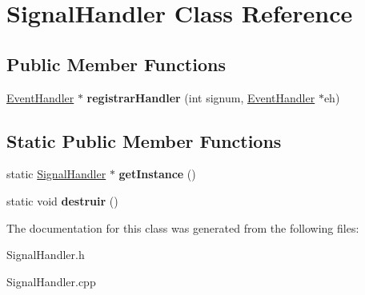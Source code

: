 \hypertarget{classSignalHandler}{\section{Signal\-Handler Class Reference}
\label{classSignalHandler}
}
\subsection*{Public Member Functions}
\begin{DoxyCompactItemize}
\item 
\hypertarget{classSignalHandler_a41a15d866eed0c4df9ef8f685ce4d6a7}{\hyperlink{classEventHandler}{Event\-Handler} $\ast$ {\bfseries registrar\-Handler} (int signum, \hyperlink{classEventHandler}{Event\-Handler} $\ast$eh)}\label{classSignalHandler_a41a15d866eed0c4df9ef8f685ce4d6a7}

\end{DoxyCompactItemize}
\subsection*{Static Public Member Functions}
\begin{DoxyCompactItemize}
\item 
\hypertarget{classSignalHandler_a753799244d13e9c998e8b6c7696f4b91}{static \hyperlink{classSignalHandler}{Signal\-Handler} $\ast$ {\bfseries get\-Instance} ()}\label{classSignalHandler_a753799244d13e9c998e8b6c7696f4b91}

\item 
\hypertarget{classSignalHandler_afae3c473d92a8a2c7bd29ee26078ee70}{static void {\bfseries destruir} ()}\label{classSignalHandler_afae3c473d92a8a2c7bd29ee26078ee70}

\end{DoxyCompactItemize}


The documentation for this class was generated from the following files\-:\begin{DoxyCompactItemize}
\item 
Signal\-Handler.\-h\item 
Signal\-Handler.\-cpp\end{DoxyCompactItemize}
